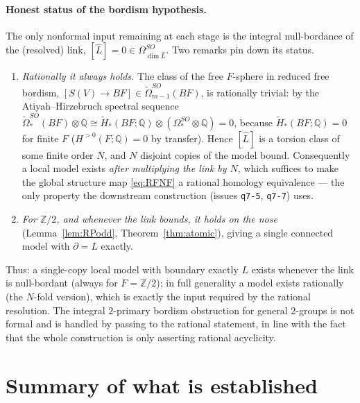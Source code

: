\documentclass[12pt]{article}
\theoremstyle{definition}
\begin{document}
\paragraph{Honest status of the bordism hypothesis.}
The only nonformal input remaining at each stage is the integral
null-bordance of the (resolved) link, $[\widehat L]=0\in\Omega^{SO}_{\dim
\widehat L}$. Two remarks pin down its status.
\begin{enumerate}
\item \emph{Rationally it always holds.} The class of the free $F$-sphere in
reduced free bordism, $[S(V)\to BF]\in\widetilde\Omega^{SO}_{m-1}(BF)$, is
rationally trivial: by the Atiyah--Hirzebruch spectral sequence
$\widetilde\Omega^{SO}_*(BF)\otimes\mathbb{Q}\cong
\widetilde H_*(BF;\mathbb{Q})\otimes(\Omega^{SO}_*\otimes\mathbb{Q})=0$, because
$\widetilde H_*(BF;\mathbb{Q})=0$ for finite $F$ ($H^{>0}(F;\mathbb{Q})=0$ by
transfer). Hence $[\widehat L]$ is a torsion class of some finite order $N$, and
$N$ disjoint copies of the model bound. Consequently a local model exists
\emph{after multiplying the link by $N$}, which suffices to make the global
structure map \eqref{eq:RFNF} a rational homology equivalence --- the only
property the downstream construction (issues \texttt{q7-5}, \texttt{q7-7}) uses.
\item \emph{For $\mathbb{Z}/2$, and whenever the link bounds, it holds on the
nose} (Lemma~\ref{lem:RPodd}, Theorem~\ref{thm:atomic}), giving a single
connected model with $\partial=L$ exactly.
\end{enumerate}
Thus: a single-copy local model with boundary exactly $L$ exists whenever the
link is null-bordant (always for $F=\mathbb{Z}/2$); in full generality a model
exists rationally (the $N$-fold version), which is exactly the input required by
the rational resolution. The integral $2$-primary bordism obstruction for
general $2$-groups is not formal and is handled by passing to the rational
statement, in line with the fact that the whole construction is only asserting
rational acyclicity.

\section{Summary of what is established}\label{sec:summary}
\end{document}
